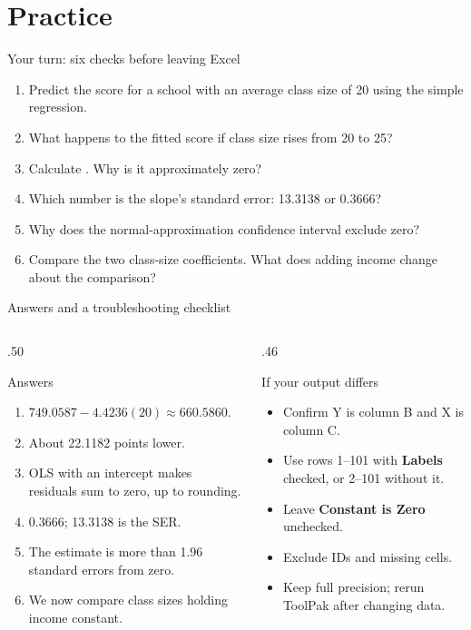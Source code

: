 \documentclass[notes,10pt,aspectratio=169]{beamer}
\newcommand{\xl}[1]{{\small\texttt{\detokenize{#1}}}}
\begin{document}
\section{Practice}
\begin{frame}{Your turn: six checks before leaving Excel}
\begin{enumerate}
\setlength{\itemsep}{9pt}
\item Predict the score for a school with an average class size of 20 using the simple regression.
\item What happens to the fitted score if class size rises from 20 to 25?
\item Calculate \xl{=SUM(Data!F2:F101)}. Why is it approximately zero?
\item Which number is the slope's standard error: 13.3138 or 0.3666?
\item Why does the normal-approximation confidence interval exclude zero?
\item Compare the two class-size coefficients. What does adding income change about the comparison?
\end{enumerate}
\end{frame}

\begin{frame}{Answers and a troubleshooting checklist}
\begin{columns}[T]
\begin{column}{.50\textwidth}
\begin{block}{Answers}
\begin{enumerate}
\setlength{\itemsep}{5pt}
\item $749.0587-4.4236(20)\approx660.5860$.
\item About 22.1182 points lower.
\item OLS with an intercept makes residuals sum to zero, up to rounding.
\item 0.3666; 13.3138 is the SER.
\item The estimate is more than 1.96 standard errors from zero.
\item We now compare class sizes holding income constant.
\end{enumerate}
\end{block}
\end{column}
\begin{column}{.46\textwidth}
\begin{block}{If your output differs}
\begin{itemize}
\setlength{\itemsep}{7pt}
\item Confirm Y is column B and X is column C.
\item Use rows 1--101 with \textbf{Labels} checked, or 2--101 without it.
\item Leave \textbf{Constant is Zero} unchecked.
\item Exclude IDs and missing cells.
\item Keep full precision; rerun ToolPak after changing data.
\end{itemize}
\end{block}
\end{column}
\end{columns}
\end{frame}
\end{document}
